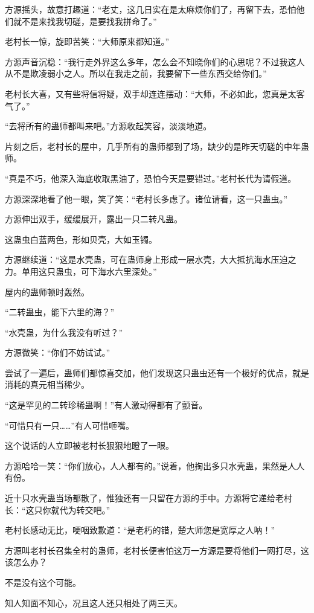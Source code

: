\begin{this_body}
方源摇头，故意打趣道：“老丈，这几日实在是太麻烦你们了，再留下去，恐怕他们就不是来找我切磋，是要找我拼命了。”

老村长一惊，旋即苦笑：“大师原来都知道。”

方源声音沉稳：“我行走外界这么多年，怎么会不知晓你们的心思呢？不过我这人从不是欺凌弱小之人。所以在我走之前，我要留下一些东西交给你们。”

老村长大喜，又有些将信将疑，双手却连连摆动：“大师，不必如此，您真是太客气了。”

“去将所有的蛊师都叫来吧。”方源收起笑容，淡淡地道。

片刻之后，老村长的屋中，几乎所有的蛊师都到了场，缺少的是昨天切磋的中年蛊师。

“真是不巧，他深入海底收取黑油了，恐怕今天是要错过。”老村长代为请假道。

方源深深地看了他一眼，笑了笑：“老村长多虑了。诸位请看，这一只蛊虫。”

方源伸出双手，缓缓展开，露出一只二转凡蛊。

这蛊虫白蓝两色，形如贝壳，大如玉镯。

方源继续道：“这是水壳蛊，可在蛊师身上形成一层水壳，大大抵抗海水压迫之力。单用这只蛊虫，可下海水六里深处。”

屋内的蛊师顿时轰然。

“二转蛊虫，能下六里的海？”

“水壳蛊，为什么我没有听过？”

方源微笑：“你们不妨试试。”

尝试了一遍后，蛊师们都惊喜交加，他们发现这只蛊虫还有一个极好的优点，就是消耗的真元相当稀少。

“这是罕见的二转珍稀蛊啊！”有人激动得都有了颤音。

“可惜只有一只……”有人可惜咂嘴。

这个说话的人立即被老村长狠狠地瞪了一眼。

方源哈哈一笑：“你们放心，人人都有的。”说着，他掏出多只水壳蛊，果然是人人有份。

近十只水壳蛊当场都散了，惟独还有一只留在方源的手中。方源将它递给老村长：“这只你就代为转交吧。”

老村长感动无比，哽咽致歉道：“是老朽的错，楚大师您是宽厚之人呐！”

方源叫老村长召集全村的蛊师，老村长便害怕这万一方源是要将他们一网打尽，这该怎么办？

不是没有这个可能。

知人知面不知心，况且这人还只相处了两三天。


\end{this_body}
